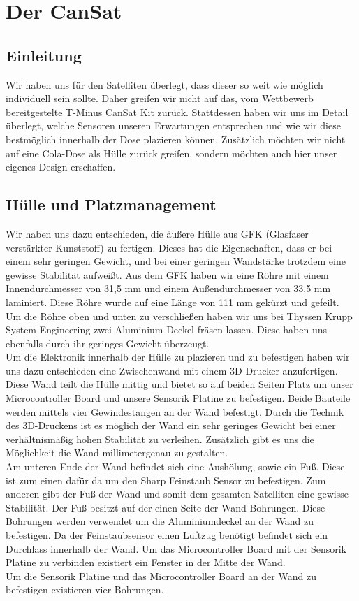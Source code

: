 \section{Der CanSat}
\subsection{Einleitung}
Wir haben uns für den Satelliten überlegt, dass dieser so weit wie möglich individuell sein sollte. Daher greifen wir nicht auf das, vom Wettbewerb bereitgestelte T-Minus CanSat Kit zurück. Stattdessen haben wir uns im Detail überlegt, welche Sensoren unseren Erwartungen entsprechen und wie wir diese bestmöglich innerhalb der Dose plazieren können. Zusätzlich möchten wir nicht auf eine Cola-Dose als Hülle zurück greifen, sondern möchten auch hier unser eigenes Design erschaffen.

\subsection {Hülle und Platzmanagement}
Wir haben uns dazu entschieden, die äußere Hülle aus GFK (Glasfaser verstärkter Kunststoff) zu fertigen. Dieses hat die Eigenschaften, dass er bei einem sehr geringen Gewicht, und bei einer geringen Wandstärke trotzdem eine gewisse Stabilität aufweißt. Aus dem GFK haben wir eine Röhre mit einem Innendurchmesser von 31,5 mm und einem Außendurchmesser von 33,5 mm laminiert. Diese Röhre wurde auf eine Länge von 111 mm gekürzt und gefeilt. Um die Röhre oben und unten zu verschließen haben wir uns bei Thyssen Krupp System Engineering zwei Aluminium Deckel fräsen lassen. Diese haben uns ebenfalls durch ihr geringes Gewicht überzeugt. \\
Um die Elektronik innerhalb der Hülle zu plazieren und zu befestigen haben wir uns dazu entschieden eine Zwischenwand mit einem 3D-Drucker anzufertigen. Diese Wand teilt die Hülle mittig und bietet so auf beiden Seiten Platz um unser Microcontroller Board und unsere Sensorik Platine zu befestigen. Beide Bauteile werden mittels vier Gewindestangen an der Wand befestigt. Durch die Technik des 3D-Druckens ist es möglich der Wand ein sehr geringes Gewicht bei einer verhältnismäßig hohen Stabilität zu verleihen. Zusätzlich gibt es uns die Möglichkeit die Wand millimetergenau zu gestalten. \\
Am unteren Ende der Wand befindet sich eine Aushölung, sowie ein Fuß. Diese ist zum einen dafür da um den Sharp Feinstaub Sensor zu befestigen. Zum anderen gibt der Fuß der Wand und somit dem gesamten Satelliten eine gewisse Stabilität. Der Fuß besitzt auf der einen Seite der Wand Bohrungen. Diese Bohrungen werden verwendet um die Aluminiumdeckel an der Wand zu befestigen. Da der Feinstaubsensor einen Luftzug benötigt befindet sich ein Durchlass innerhalb der Wand. Um das Microcontroller Board mit der Sensorik Platine zu verbinden existiert ein Fenster in der Mitte der Wand. \\
Um die Sensorik Platine und das Microcontroller Board an der Wand zu befestigen existieren vier Bohrungen.


